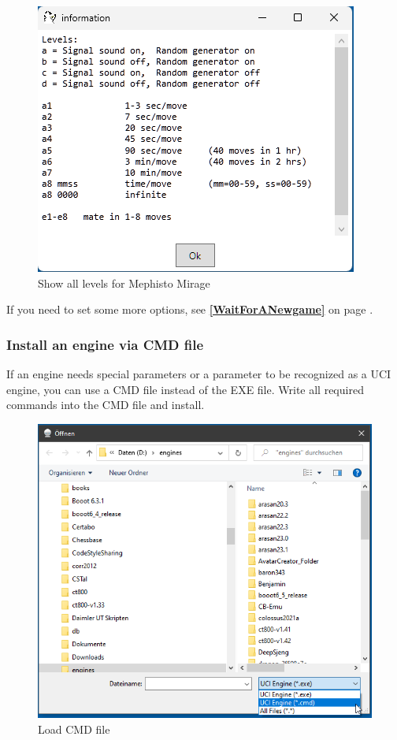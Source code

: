 \documentclass[11pt,a4paper]{article}
\begin{document}
	\begin{figure}[H]
		\centering
		\includegraphics[scale=1.0]{MessChess6.png}
		\caption{Show all levels for Mephisto Mirage}
		\label{fig:MessChess6}
	\end{figure}
	
	
	If you need to set some more options, see \textbf{\ref{WaitForANewgame}  } on page \pageref{WaitForANewgame}.
	
	\subsubsection{Install an engine via CMD file} \label{ViaCMDFile}
	If an engine needs special parameters or a parameter to be recognized as a UCI engine, you can use a CMD file instead of the EXE file. Write all required commands into the CMD file and install.
	
	\begin{figure}[H]
		\centering
		\includegraphics[scale=0.8]{LoadEngineCmd.png}
		\caption{Load CMD file}
		\label{fig:LoadCMDfile}
	\end{figure}
	
\end{document}
